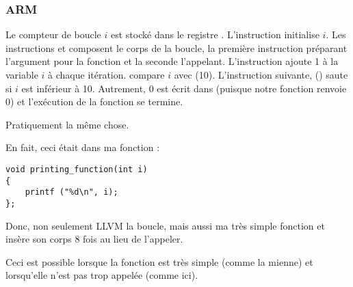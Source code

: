 \subsubsection{ARM}

\myparagraph{\NonOptimizingKeilVI (\ARMMode)}



Le compteur de boucle $i$ est stocké dans le registre .
L'instruction  initialise $i$.
Les instructions  et  composent le corps
de la boucle, la première instruction préparant l'argument pour la fonction \ttf
et la seconde l'appelant.
L'instruction  ajoute 1 à la variable $i$ à chaque itération.
 compare $i$ avec  (10). 
L'instruction suivante,  () saute si $i$ est inférieur
à 10.
Autrement, 0 est écrit dans  (puisque notre fonction renvoie 0) et l'exécution
de la fonction se termine.

\myparagraph{\OptimizingKeilVI (\ThumbMode)}



Pratiquement la même chose.

\myparagraph{\OptimizingXcodeIV (\ThumbTwoMode)}
\label{ARM_unrolled_loops}



En fait, ceci était dans ma fonction \ttf:

\begin{lstlisting}[style=customc]
void printing_function(int i)
{
    printf ("%d\n", i);
};
\end{lstlisting}

Donc, non seulement LLVM  la boucle, mais aussi  ma très
simple fonction et insère son corps 8 fois au lieu de l'appeler.

Ceci est possible lorsque la fonction est très simple (comme la mienne) et lorsqu'elle
n'est pas trop appelée (comme ici).






